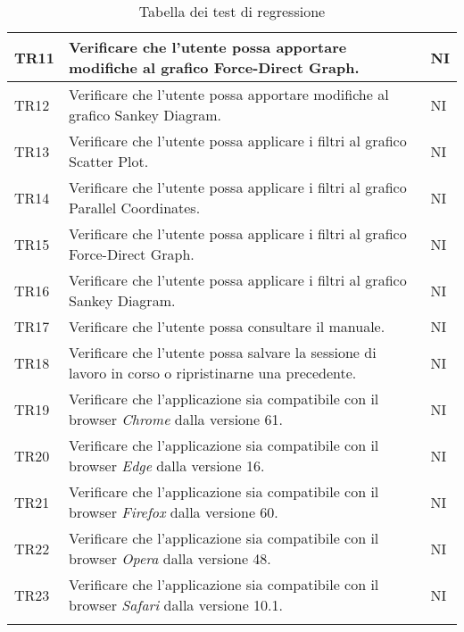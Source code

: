 \begin{center}
\begin{longtable}{|p{1.5cm}|p{11cm}|p{1cm}|}
            \rowcolor[HTML]{C0C0C0}
            TR11 & Verificare che l’utente possa apportare modifiche al grafico Force-Direct Graph. & NI\\ \hline
            \rowcolor[HTML]{EFEFEF}
            TR12 & Verificare che l’utente possa apportare modifiche al grafico Sankey Diagram. & NI\\ \hline
            \rowcolor[HTML]{C0C0C0}
            TR13 & Verificare che l’utente possa applicare i filtri al grafico Scatter Plot. & NI\\ \hline
            \rowcolor[HTML]{EFEFEF}
            TR14 & Verificare che l’utente possa applicare i filtri al grafico Parallel Coordinates. & NI\\ \hline
            \rowcolor[HTML]{C0C0C0}
            TR15 & Verificare che l’utente possa applicare i filtri al grafico Force-Direct Graph. & NI\\ \hline
            \rowcolor[HTML]{EFEFEF}
            TR16 & Verificare che l’utente possa applicare i filtri al grafico Sankey Diagram. & NI\\ \hline
            \rowcolor[HTML]{C0C0C0}
            TR17 & Verificare che l’utente possa consultare il manuale. & NI\\ \hline
            \rowcolor[HTML]{EFEFEF}
            TR18 & Verificare che l’utente possa salvare la sessione di lavoro in corso o ripristinarne una precedente. & NI\\ \hline
            \rowcolor[HTML]{C0C0C0}
            TR19 & Verificare che l'applicazione sia compatibile con il browser \textit{Chrome} dalla versione 61. & NI\\ \hline
            \rowcolor[HTML]{EFEFEF}
            TR20 & Verificare che l'applicazione sia compatibile con il browser \textit{Edge} dalla versione 16. & NI\\ \hline
            \rowcolor[HTML]{C0C0C0}
            TR21 & Verificare che l'applicazione sia compatibile con il browser \textit{Firefox} dalla versione 60. & NI\\ \hline
            \rowcolor[HTML]{EFEFEF}
            TR22 & Verificare che l'applicazione sia compatibile con il browser \textit{Opera} dalla versione 48. & NI\\ \hline
            \rowcolor[HTML]{C0C0C0}
            TR23 & Verificare che l'applicazione sia compatibile con il browser \textit{Safari} dalla versione 10.1. & NI\\ \hline
            \caption{Tabella dei test di regressione}
        \end{longtable}
    \end{center}


